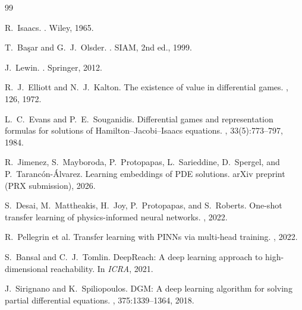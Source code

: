 \documentclass[11pt]{article}
\begin{document}

\begin{thebibliography}{99}

R.~Isaacs.
. Wiley, 1965.

T.~Ba\c{s}ar and G.~J.~Olsder.
. SIAM, 2nd ed., 1999.

J.~Lewin.
. Springer, 2012.

R.~J.~Elliott and N.~J.~Kalton.
\newblock The existence of value in differential games.
, 126, 1972.

L.~C.~Evans and P.~E.~Souganidis.
\newblock Differential games and representation formulas for solutions
of Hamilton--Jacobi--Isaacs equations.
, 33(5):773--797, 1984.

R.~Jimenez, S.~Mayboroda, P.~Protopapas, L.~Sarieddine, D.~Spergel,
and P.~Tarancón-Álvarez.
\newblock Learning embeddings of {PDE} solutions.
\newblock arXiv preprint (PRX submission), 2026.

S.~Desai, M.~Mattheakis, H.~Joy, P.~Protopapas, and S.~Roberts.
\newblock One-shot transfer learning of physics-informed neural networks.
, 2022.

R.~Pellegrin et al.
\newblock Transfer learning with PINNs via multi-head training.
, 2022.

S.~Bansal and C.~J.~Tomlin.
\newblock DeepReach: A deep learning approach to high-dimensional
reachability.
\newblock In {\em ICRA}, 2021.

J.~Sirignano and K.~Spiliopoulos.
\newblock DGM: A deep learning algorithm for solving partial
differential equations.
, 375:1339--1364, 2018.


\end{thebibliography}
\end{document}
